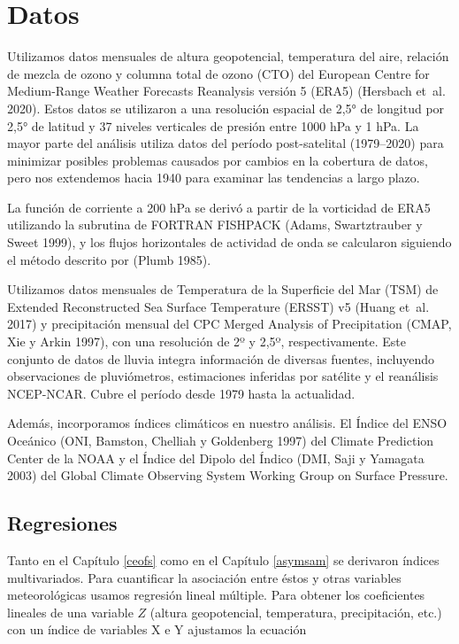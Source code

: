 \documentclass[12pt,oneside,a4paper]{reedthesis}
\begin{document}
\hypertarget{datos}{%
\section{Datos}\label{datos}}

Utilizamos datos mensuales de altura geopotencial, temperatura del aire, relación de mezcla de ozono y columna total de ozono (CTO) del European Centre for Medium-Range Weather Forecasts Reanalysis versión 5 (ERA5) (Hersbach et~al. 2020).
Estos datos se utilizaron a una resolución espacial de 2,5° de longitud por 2,5° de latitud y 37 niveles verticales de presión entre 1000 hPa y 1 hPa.
La mayor parte del análisis utiliza datos del período post-satelital (1979--2020) para minimizar posibles problemas causados por cambios en la cobertura de datos, pero nos extendemos hacia 1940 para examinar las tendencias a largo plazo.

La función de corriente a 200 hPa se derivó a partir de la vorticidad de ERA5 utilizando la subrutina de FORTRAN FISHPACK (Adams, Swartztrauber y Sweet 1999), y los flujos horizontales de actividad de onda se calcularon siguiendo el método descrito por (Plumb 1985).

Utilizamos datos mensuales de Temperatura de la Superficie del Mar (TSM) de Extended Reconstructed Sea Surface Temperature (ERSST) v5 (Huang et~al. 2017) y precipitación mensual del CPC Merged Analysis of Precipitation (CMAP, Xie y Arkin 1997), con una resolución de 2º y 2,5º, respectivamente.
Este conjunto de datos de lluvia integra información de diversas fuentes, incluyendo observaciones de pluviómetros, estimaciones inferidas por satélite y el reanálisis NCEP-NCAR.
Cubre el período desde 1979 hasta la actualidad.

Además, incorporamos índices climáticos en nuestro análisis.
El Índice del ENSO Oceánico (ONI, Bamston, Chelliah y Goldenberg 1997) del Climate Prediction Center de la NOAA y el Índice del Dipolo del Índico (DMI, Saji y Yamagata 2003) del Global Climate Observing System Working Group on Surface Pressure.

\hypertarget{regresiones}{%
\subsection{Regresiones}\label{regresiones}}

Tanto en el Capítulo \ref{ceofs} como en el Capítulo \ref{asymsam} se derivaron índices multivariados.
Para cuantificar la asociación entre éstos y otras variables meteorológicas usamos regresión lineal múltiple.
Para obtener los coeficientes lineales de una variable \(Z\) (altura geopotencial, temperatura, precipitación, etc.) con un índice de variables X e Y ajustamos la ecuación
\end{document}
